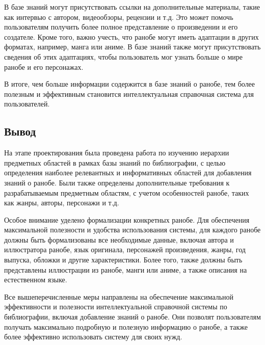 В базе знаний могут присутствовать ссылки на дополнительные материалы, такие как интервью с автором, видеообзоры, рецензии и т.д. Это может помочь пользователям получить более полное представление о произведении и его создателе. Кроме того, важно учесть, что ранобе могут иметь адаптации в других форматах, например, манга или аниме. В базе знаний также могут присутствовать сведения об этих адаптациях, чтобы пользователь мог узнать больше о мире ранобе и его персонажах.

В итоге, чем больше информации содержится в базе знаний о ранобе, тем более полезным и эффективным становится интеллектуальная справочная система для пользователей.

\subsection{Вывод}
На этапе проектирования была проведена работа по изучению иерархии предметных областей в рамках базы знаний по библиографии, с целью определения наиболее релевантных и информативных областей для добавления знаний о ранобе. Были также определены дополнительные требования к разрабатываемым предметным областям, с учетом особенностей ранобе, таких как жанры, авторы, персонажи и т.д.

Особое внимание уделено формализации конкретных ранобе. Для обеспечения максимальной полезности и удобства использования системы, для каждого ранобе должны быть формализованы все необходимые данные, включая автора и иллюстратора ранобе, язык оригинала, персонажей произведения, жанры, год выпуска, обложки и другие характеристики. Более того, также должны быть представлены иллюстрации из ранобе, манги или аниме, а также описания на естественном языке.

Все вышеперечисленные меры направлены на обеспечение максимальной эффективности и полезности интеллектуальной справочной системы по библиографии, включая добавление знаний о ранобе. Они позволят пользователям получать максимально подробную и полезную информацию о ранобе, а также более эффективно использовать систему для своих нужд.
